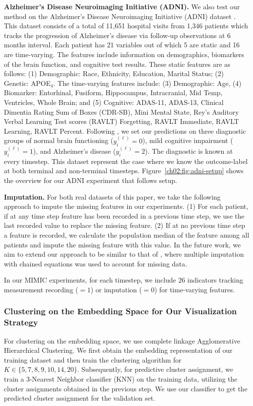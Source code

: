 \noindent
\textbf{Alzheimer's Disease Neuroimaging Initiative (ADNI).}
We also test our method on the Alzheimer's Disease Neuroimaging Initiative (ADNI) dataset \citep{petersen2010alzheimer}. 
This dataset consists of a total of 11,651 hospital visits from 1,346 patients which tracks the progression of Alzheimer's disease via follow-up observations at 6 months interval. 
Each patient has 21 variables out of which 5 are static and 16 are time-varying. 
The features include information on demographics, biomarkers of the brain function, and cognitive test results. 
These static features are as follows: (1) Demographic: Race, Ethnicity, Education, Marital Status; (2) Genetic: APOE$_4$.
The time-varying features include: (3) Demographic: Age, (4) Biomarker: Entorhinal, Fusiform, Hippocampus, Intracranial, Mid Temp, Ventricles, Whole Brain; and (5) Cognitive: ADAS-11, ADAS-13, Clinical Dimentia Rating Sum of Boxes (CDR-SB), Mini Mental State, Rey's Auditory Verbal Learning Test scores (RAVLT) Forgetting, RAVLT Immediate, RAVLT Learning, RAVLT Percent.
Following \citet{lee2020temporal}, we set our predictions on three diagnostic groups of normal brain functioning ($y_i^{(\ell)}=0$), mild cognitive impairment ($y_i^{(\ell)}=1$), and Alzheimer’s disease ($y_i^{(\ell)}=2$). 
The diagnostic is known at every timestep.
This dataset represent the case where we know the outcome-label at both terminal and non-terminal timesteps. 
Figure~\ref{ch02:fig:adni-setup} shows the overview for our ADNI experiment that follows \citet{lee2020temporal} setup.


\noindent
\textbf{Imputation.}
For both real datasets of this paper, we take the following approach to impute the missing features in our experiments. 
(1) For each patient, if at any time step feature has been recorded in a previous time step, we use the last recorded value to replace the missing feature.
(2) If at no previous time step a feature is recorded, we calculate the population median of the feature among all patients and impute the missing feature with this value.
In the future work, we aim to extend our approach to be similar to that of \citet{seymour2019derivation}, where multiple imputation with chained equations was used to account for missing data. 

In our MIMIC experiments, for each timestep, we include 26 indicators tracking measurement recording ($=1$) or imputation ($=0$) for time-varying features.


\subsubsection{Clustering on the Embedding Space for Our Visualization Strategy}
\label{ch02:sec:cluster}
For clustering on the embedding space, we use complete linkage Agglomerative Hierarchical Clustering. 
We first obtain the embedding representation of our training dataset and then train the clustering algorithm for $K\in\{5,7,8,9,10,14,20\}$. 
Subsequently, for predictive cluster assignment, we train a 3-Nearest Neighbor classifier (KNN) on the training data, utilizing the cluster assignments obtained in the previous step.
We use our classifier to get the predicted cluster assignment for the validation set. 


